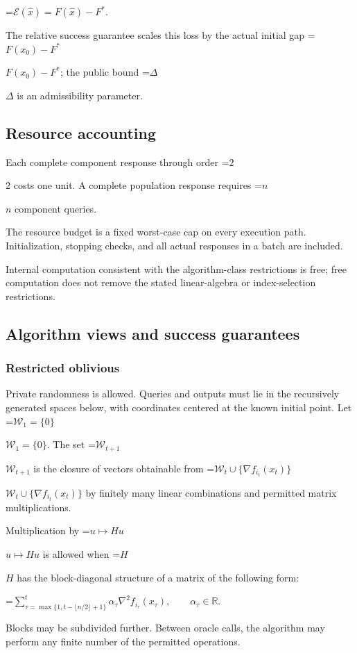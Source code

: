 \documentclass[10pt,a4paper]{article}
\newcommand{\AtlasMath}[1]{\par\begingroup\centering\setbox0=\hbox{$\displaystyle #1$}\ifdim\wd0>1.4\linewidth\typeout{ATLAS WIDE FORMULA: \the\wd0}\fi\ifdim\wd0>\linewidth\resizebox{\linewidth}{!}{\box0}\else\box0\fi\par\endgroup}
\newcommand{\AtlasInlineMath}[1]{\begingroup\setbox0=\hbox{$#1$}\ifdim\wd0>.4\linewidth\endgroup\AtlasMath{#1}\else\endgroup$#1$\fi}
\begin{document}
\AtlasMath{\mathcal{E}(\widehat{x})=F(\widehat{x})-F^*.}


The relative success guarantee scales this loss by the actual initial gap \AtlasInlineMath{F(x_0)-F^*}; the public bound \AtlasInlineMath{\Delta} is an admissibility parameter.

\subsection{Resource accounting}
Each complete component response through order \AtlasInlineMath{2} costs one unit. A complete population response requires \AtlasInlineMath{n} component queries.

The resource budget is a fixed worst-case cap on every execution path. Initialization, stopping checks, and all actual responses in a batch are included.

Internal computation consistent with the algorithm-class restrictions is free; free computation does not remove the stated linear-algebra or index-selection restrictions.

\subsection{Algorithm views and success guarantees}
\subsubsection{Restricted oblivious}
Private randomness is allowed. Queries and outputs must lie in the recursively generated spaces below, with coordinates centered at the known initial point. Let \AtlasInlineMath{\mathcal{W}_1=\{0\}}. The set \AtlasInlineMath{\mathcal{W}_{t+1}} is the closure of vectors obtainable from \AtlasInlineMath{\mathcal{W}_t\cup\{\nabla f_{i_t}(x_t)\}} by finitely many linear combinations and permitted matrix multiplications.

Multiplication by \AtlasInlineMath{u\mapsto Hu} is allowed when \AtlasInlineMath{H} has the block-diagonal structure of a matrix of the following form:


\AtlasMath{\sum_{\tau=\max\{1,t-\lfloor n/2\rfloor+1\}}^{t}\alpha_\tau\nabla^2f_{i_\tau}(x_\tau),\qquad\alpha_\tau\in\mathbb{R}.}


Blocks may be subdivided further. Between oracle calls, the algorithm may perform any finite number of the permitted operations.
\end{document}
